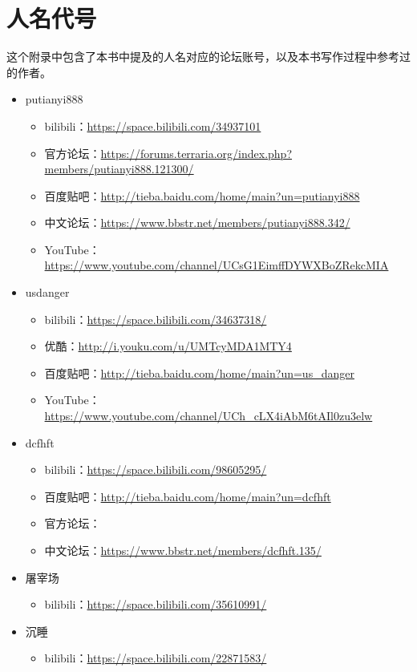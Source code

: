 \chapter{人名代号}
这个附录中包含了本书中提及的人名对应的论坛账号，以及本书写作过程中参考过的作者。
\begin{itemize}
\item putianyi888
\begin{itemize}
\item bilibili：\url{https://space.bilibili.com/34937101}
\item 官方论坛：\url{https://forums.terraria.org/index.php?members/putianyi888.121300/}
\item 百度贴吧：\url{http://tieba.baidu.com/home/main?un=putianyi888}
\item 中文论坛：\url{https://www.bbstr.net/members/putianyi888.342/}
\item YouTube：\url{https://www.youtube.com/channel/UCsG1EimffDYWXBoZRekcMIA}
\end{itemize}
\item usdanger
\begin{itemize}
    \item bilibili：\url{https://space.bilibili.com/34637318/}
    \item 优酷：\url{http://i.youku.com/u/UMTcyMDA1MTY4}
    \item 百度贴吧：\url{http://tieba.baidu.com/home/main?un=us_danger}
    \item YouTube：\url{https://www.youtube.com/channel/UCh_cLX4iAbM6tAIl0zu3elw}
\end{itemize}
\item dcfhft
\begin{itemize}
    \item bilibili：\url{https://space.bilibili.com/98605295/}
    \item 百度贴吧：\url{http://tieba.baidu.com/home/main?un=dcfhft}
    \item 官方论坛：
    \item 中文论坛：\url{https://www.bbstr.net/members/dcfhft.135/}
\end{itemize}
\item 屠宰场
\begin{itemize}
    \item bilibili：\url{https://space.bilibili.com/35610991/}
\end{itemize}
\item 沉睡
\begin{itemize}
    \item bilibili：\url{https://space.bilibili.com/22871583/}

\end{itemize}
\end{itemize}
